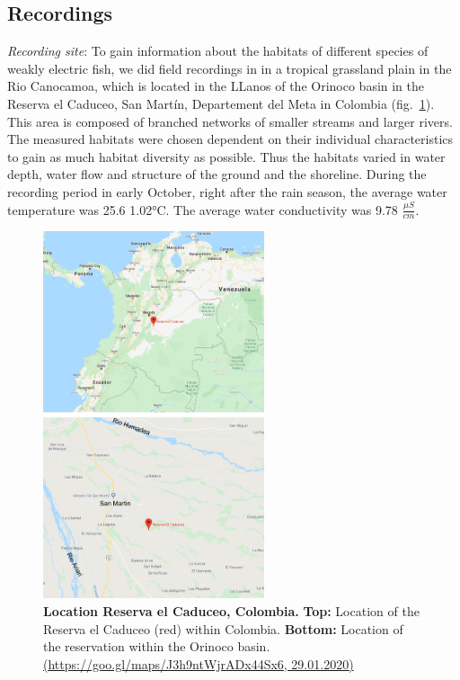 \subsection{Recordings}
\label{sec:recordings}

\textit{Recording site}: To gain information about the habitats of different species of weakly electric fish, we did field recordings in in a tropical grassland plain in the Rio Canocamoa, which is located in the LLanos of the Orinoco basin in the Reserva el Caduceo, San Martín, Departement del Meta in Colombia (fig.~\ref{fig:map}). This area is composed of branched networks of smaller streams and larger rivers.
The measured habitats were chosen dependent on their individual characteristics to gain as much habitat diversity as possible. Thus the habitats varied in water depth, water flow and structure of the ground and the shoreline. During the recording period in early October, right after the rain season, the average water temperature was 25.6 \rpm \ang{1.02}C. The average water conductivity was 9.78  $\frac{\mu S}{cm}$.

\begin{figure}[H]
    \centering
    \includegraphics[width=0.58\textwidth]{pictures/Methods/map.png}
    \caption{\textbf{Location Reserva el Caduceo, Colombia.} \textbf{Top:} Location of the Reserva el Caduceo (red) within Colombia. \textbf{Bottom:} Location of the reservation within the Orinoco basin. \url{(https://goo.gl/maps/J3h9ntWjrADx44Sx6, 29.01.2020)}}
    \label{fig:map}
\end{figure}{}

